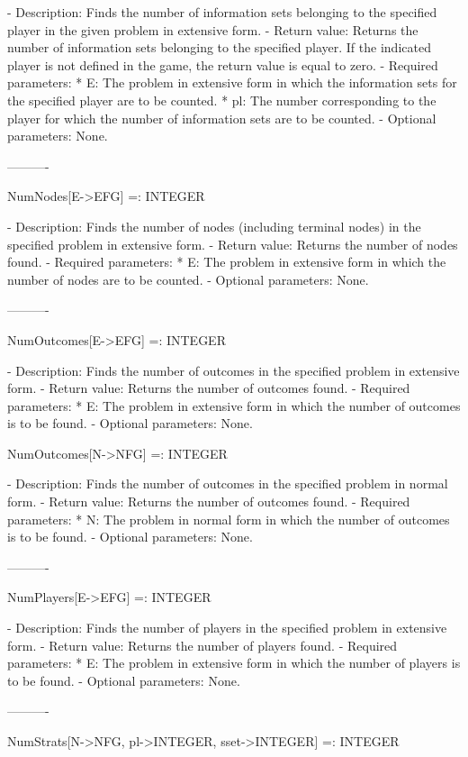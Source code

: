    -	Description:  Finds the number of information sets belonging to the
	specified player in the given problem in extensive form.
   -	Return value:  Returns the number of information sets belonging to
	the specified player.  If the indicated player is not defined in the 
	game, the return value is equal to zero.
   -	Required parameters:
	  *  E:  The problem in extensive form in which the information sets
		for the specified player are to be counted.
	  *  pl:  The number corresponding to the player for which the number 
		of information sets are to be counted.
   -	Optional parameters:  None.

----------

NumNodes[E->EFG] =: INTEGER

   -	Description:  Finds the number of nodes (including terminal nodes) in 
	the specified problem in extensive form.
   -	Return value:  Returns the number of nodes found.
   -	Required parameters:
	  *  E:  The problem in extensive form in which the number of nodes are
		to be counted.
   -	Optional parameters:  None.

----------

NumOutcomes[E->EFG] =: INTEGER

   -	Description:  Finds the number of outcomes in the specified problem in
	extensive form.
   -	Return value:  Returns the number of outcomes found.
   -	Required parameters:
	  *  E:  The problem in extensive form in which the number of outcomes
		is to be found.
   -	Optional parameters:  None.


NumOutcomes[N->NFG] =: INTEGER

   -	Description:  Finds the number of outcomes in the specified problem in
	normal form.
   -	Return value:  Returns the number of outcomes found.
   -	Required parameters:
	  *  N:  The problem in normal form in which the number of outcomes is
		to be found.
   -	Optional parameters:  None.

----------

NumPlayers[E->EFG] =: INTEGER

   -	Description:  Finds the number of players in the specified problem in
	extensive form.
   -	Return value:  Returns the number of players found.
   -	Required parameters:
	  *  E:  The problem in extensive form in which the number of players
		is to be found.
   -	Optional parameters:  None.

----------

NumStrats[N->NFG, pl->INTEGER, {sset->INTEGER}] =: INTEGER

